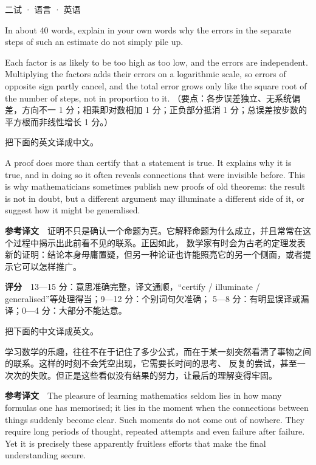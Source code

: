 \documentclass[cjk=noto, seal=first]{mojing-exam}
\begin{document}
\begin{paper}[time={建议 2 小时（训练设置）}, full=100]{二试 · 语言 · 英语}
\begin{questions}
\question[4] In about 40 words, explain in your own words why the errors in the separate steps of such an estimate do not simply pile up.
\answerspace{2.5cm}
\begin{solution}
Each factor is as likely to be too high as too low, and the errors are independent. Multiplying the factors adds their errors on a
logarithmic scale, so errors of opposite sign partly cancel, and the total error grows only like the square root of the number of
steps, not in proportion to it.
（要点：各步误差独立、无系统偏差，方向不一 1 分；相乘即对数相加 1 分；正负部分抵消 1 分；总误差按步数的平方根而非线性增长 1 分。）
\end{solution}
\end{questions}


\begin{questions}
\question[15] 把下面的英文译成中文。

A proof does more than certify that a statement is true. It explains why it is true, and in doing so it often reveals connections
that were invisible before. This is why mathematicians sometimes publish new proofs of old theorems: the result is not in doubt,
but a different argument may illuminate a different side of it, or suggest how it might be generalised.
\answerspace{4cm}
\begin{solution}
\textbf{参考译文}　证明不只是确认一个命题为真。它解释命题为什么成立，并且常常在这个过程中揭示出此前看不见的联系。正因如此，
数学家有时会为古老的定理发表新的证明：结论本身毋庸置疑，但另一种论证也许能照亮它的另一个侧面，或者提示它可以怎样推广。

\textbf{评分}　13—15 分：意思准确完整，译文通顺，“certify / illuminate / generalised”等处理得当；9—12 分：个别词句欠准确；
5—8 分：有明显误译或漏译；0—4 分：大部分不能达意。
\end{solution}

\question[15] 把下面的中文译成英文。

{\kaishu 学习数学的乐趣，往往不在于记住了多少公式，而在于某一刻突然看清了事物之间的联系。这样的时刻不会凭空出现，它需要长时间的思考、
反复的尝试，甚至一次次的失败。但正是这些看似没有结果的努力，让最后的理解变得牢固。\par}
\answerspace{4cm}
\begin{solution}
\textbf{参考译文}　The pleasure of learning mathematics seldom lies in how many formulas one has memorised; it lies in the moment when
the connections between things suddenly become clear. Such moments do not come out of nowhere. They require long periods of thought,
repeated attempts and even failure after failure. Yet it is precisely these apparently fruitless efforts that make the final
understanding secure.


\end{solution}
\end{questions}
\end{paper}
\end{document}
